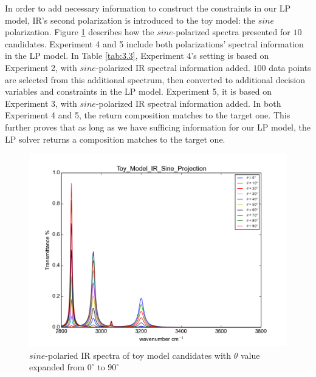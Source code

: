 In order to add necessary information to construct the constraints in our LP model, IR's second polarization is introduced to the toy model: the $sine$ polarization. Figure \ref{fig:3.4} describes how the $sine$-polarized spectra presented for $10$ candidates. Experiment 4 and 5 include both polarizations' spectral information in the LP model. In Table \ref{tab:3.3}, Experiment 4's setting is based on Experiment 2, with $sine$-polarized IR spectral information added. $100$ data points are selected from this additional spectrum, then converted to additional decision variables and constraints in the LP model. Experiment 5, it is based on Experiment 3, with $sine$-polarized IR spectral information added. In both Experiment 4 and 5, the return composition matches to the target one. This further proves that as long as we have sufficing information for our LP model, the LP solver returns a composition matches to the target one. \\ 

\begin{figure}[!ht]
\centering
\includegraphics[scale=0.7]{Figures/Toy_Model_IR_Sine_Projection.png} 
\caption{$sine$-polaried IR spectra of toy model candidates with $\theta$ value expanded from $0^{\circ}$ to $90^{\circ}$}  \label{fig:3.4}
\end{figure}

